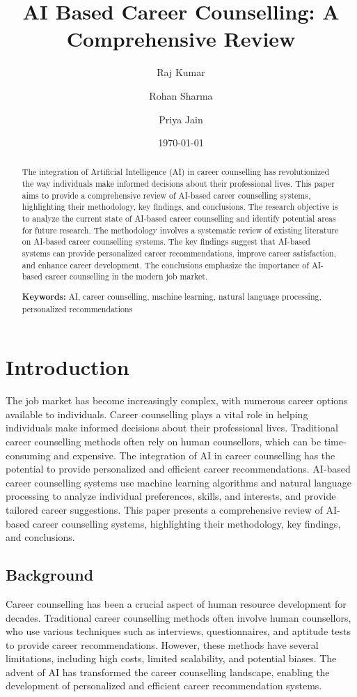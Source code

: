 \documentclass[12pt,a4paper]{article}
\title{AI Based Career Counselling: A Comprehensive Review}
\author{Raj Kumar \and Rohan Sharma \and Priya Jain}
\date{\today}
\begin{document}
\maketitle
\thispagestyle{empty}

\begin{abstract}
The integration of Artificial Intelligence (AI) in career counselling has revolutionized the way individuals make informed decisions about their professional lives. This paper aims to provide a comprehensive review of AI-based career counselling systems, highlighting their methodology, key findings, and conclusions. The research objective is to analyze the current state of AI-based career counselling and identify potential areas for future research. The methodology involves a systematic review of existing literature on AI-based career counselling systems. The key findings suggest that AI-based systems can provide personalized career recommendations, improve career satisfaction, and enhance career development. The conclusions emphasize the importance of AI-based career counselling in the modern job market. 

\textbf{Keywords:} AI, career counselling, machine learning, natural language processing, personalized recommendations
\end{abstract}

\newpage
\tableofcontents
\newpage

\twocolumn
\section{Introduction}
The job market has become increasingly complex, with numerous career options available to individuals. Career counselling plays a vital role in helping individuals make informed decisions about their professional lives. Traditional career counselling methods often rely on human counsellors, which can be time-consuming and expensive. The integration of AI in career counselling has the potential to provide personalized and efficient career recommendations. AI-based career counselling systems use machine learning algorithms and natural language processing to analyze individual preferences, skills, and interests, and provide tailored career suggestions. This paper presents a comprehensive review of AI-based career counselling systems, highlighting their methodology, key findings, and conclusions.

\subsection{Background}
Career counselling has been a crucial aspect of human resource development for decades. Traditional career counselling methods often involve human counsellors, who use various techniques such as interviews, questionnaires, and aptitude tests to provide career recommendations. However, these methods have several limitations, including high costs, limited scalability, and potential biases. The advent of AI has transformed the career counselling landscape, enabling the development of personalized and efficient career recommendation systems.
\end{document}
